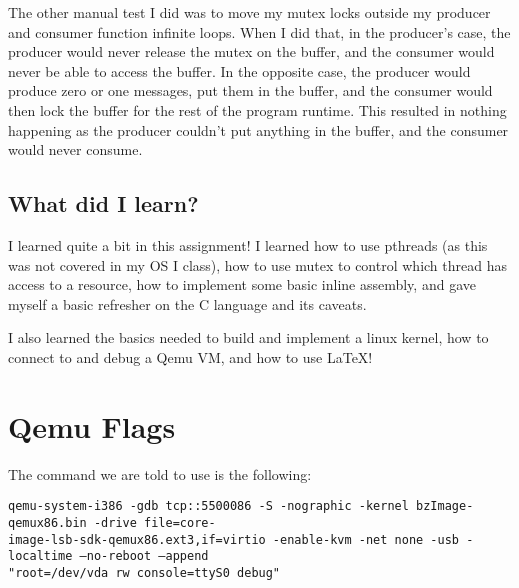 \documentclass[10pt,letterpaper]{article}
\begin{document}
  \noindent The other manual test I did was to move my mutex locks outside my
  producer and consumer function infinite loops. When I did that, in the producer's
  case, the producer would never release the mutex on the buffer, and the consumer
  would never be able to access the buffer. In the opposite case, the producer
  would produce zero or one messages, put them in the buffer, and the consumer
  would then lock the buffer for the rest of the program runtime. This resulted
  in nothing happening as the producer couldn't put anything in the buffer, and
  the consumer would never consume.

  \subsection{What did I learn?}
  I learned quite a bit in this assignment! I learned how to use pthreads (as this
  was not covered in my OS I class), how to use mutex to control which thread
  has access to a resource, how to implement some basic inline assembly, and
  gave myself a basic refresher on the C language and its caveats.

  \noindent I also learned the basics needed to build and implement a linux kernel,
  how to connect to and debug a Qemu VM, and how to use \LaTeX{}!

\section{Qemu Flags}
  The command we are told to use is the following:

  \noindent \texttt{qemu-system-i386 -gdb tcp::5500086 -S -nographic -kernel
      bzImage-qemux86.bin -drive file=core-\\image-lsb-sdk-qemux86.ext3,if=virtio
      -enable-kvm -net none -usb -localtime --no-reboot --append\\ "root=/dev/vda
      rw console=ttyS0 debug"}
\end{document}
